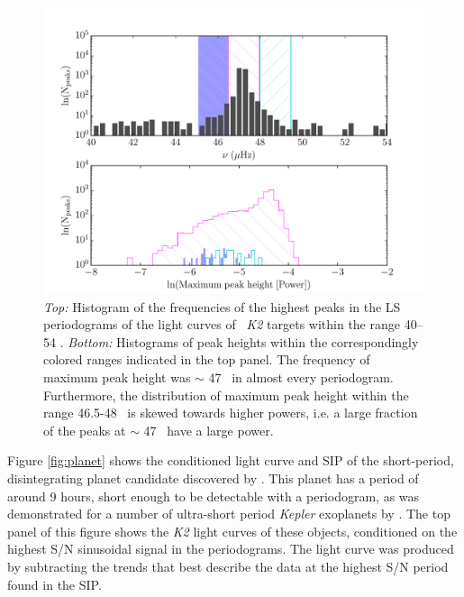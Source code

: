 \begin{figure}[h]
\begin{center}
\includegraphics[width=6in, clip=true]{figures/vbg_hist.pdf}
\caption{{\it Top:} Histogram of the frequencies of the highest peaks in the
	LS periodograms of the \citet{Vanderburg2014} light curves of \nGO\
	{\it K2} targets within the range 40--54 \uHz.
	{\it Bottom:} Histograms of peak heights within the correspondingly
	colored ranges indicated in the top panel.
	The frequency of maximum peak height was $\sim$ 47 \uHz\ in almost
	every periodogram.
	Furthermore, the distribution of maximum peak height within the range
	46.5-48 \uHz\ is skewed towards higher powers, i.e. a large fraction of
	the peaks at $\sim$ 47 \uHz\ have a large power.
}
\label{fig:vbg_hist}
\end{center}
\end{figure}

Figure \ref{fig:planet} shows the conditioned light curve and SIP of the
short-period, disintegrating planet candidate discovered by
\citet{Sanchis-Ojeda2015}.
This planet has a period of around 9 hours, short enough to be detectable
with a periodogram, as was demonstrated for a number of ultra-short
period {\it Kepler} exoplanets by \citet{Sanchis-Ojeda2014}.
The top panel of this figure shows the {\it K2} light curves of these
objects, conditioned on the highest S/N sinusoidal signal in the
periodograms.
The light curve was produced by subtracting the trends that best describe
the data at the highest S/N period found in the SIP.

